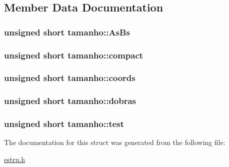 \subsection{Member Data Documentation}
\hypertarget{structtamanho_a05087a6446362b9c93abaf4f4efde68d}{
\subsubsection[{As\-Bs}]{\setlength{\rightskip}{0pt plus 5cm}unsigned short tamanho\-::\-As\-Bs}}\label{structtamanho_a05087a6446362b9c93abaf4f4efde68d}
\hypertarget{structtamanho_af8dfac00f645371e23cea496cc6432a6}{
\subsubsection[{compact}]{\setlength{\rightskip}{0pt plus 5cm}unsigned short tamanho\-::compact}}\label{structtamanho_af8dfac00f645371e23cea496cc6432a6}
\hypertarget{structtamanho_abed6a8228728489f0c9be437089d37d0}{
\subsubsection[{coords}]{\setlength{\rightskip}{0pt plus 5cm}unsigned short tamanho\-::coords}}\label{structtamanho_abed6a8228728489f0c9be437089d37d0}
\hypertarget{structtamanho_a2f92187ebcc581d9290dad7275b1abf2}{
\subsubsection[{dobras}]{\setlength{\rightskip}{0pt plus 5cm}unsigned short tamanho\-::dobras}}\label{structtamanho_a2f92187ebcc581d9290dad7275b1abf2}
\hypertarget{structtamanho_af4704386b567f96738401a53a3459bb3}{
\subsubsection[{test}]{\setlength{\rightskip}{0pt plus 5cm}unsigned short tamanho\-::test}}\label{structtamanho_af4704386b567f96738401a53a3459bb3}


The documentation for this struct was generated from the following file\-:\begin{DoxyCompactItemize}
\item 
\hyperlink{estru_8h}{estru.\-h}\end{DoxyCompactItemize}
